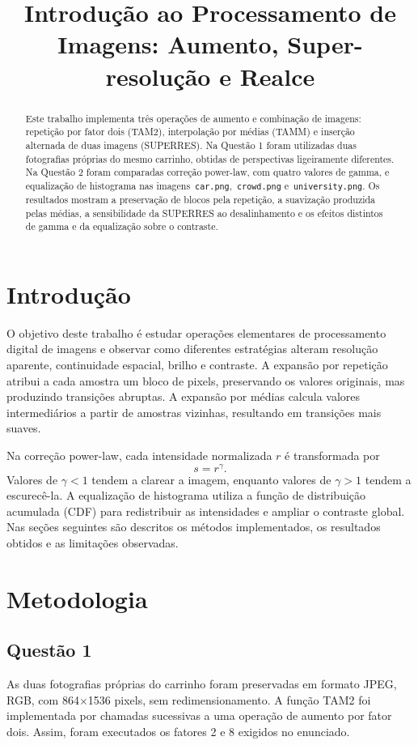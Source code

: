 \documentclass[conference]{IEEEtran}
\title{Introdução ao Processamento de Imagens: Aumento, Super-resolução e Realce}
\author{\IEEEauthorblockN{Luidgi Varela Carneiro}
\IEEEauthorblockA{Matrícula: 231011669\\
Universidade de Brasília}}
\begin{document}
\maketitle

\begin{abstract}
Este trabalho implementa três operações de aumento e combinação de imagens: repetição por fator dois (TAM2), interpolação por médias (TAMM) e inserção alternada de duas imagens (SUPERRES). Na Questão 1 foram utilizadas duas fotografias próprias do mesmo carrinho, obtidas de perspectivas ligeiramente diferentes. Na Questão 2 foram comparadas correção power-law, com quatro valores de gamma, e equalização de histograma nas imagens \,\texttt{car.png}, \,\texttt{crowd.png} e \,\texttt{university.png}. Os resultados mostram a preservação de blocos pela repetição, a suavização produzida pelas médias, a sensibilidade da SUPERRES ao desalinhamento e os efeitos distintos de gamma e da equalização sobre o contraste.
\end{abstract}

\section{Introdução}
O objetivo deste trabalho é estudar operações elementares de processamento digital de imagens e observar como diferentes estratégias alteram resolução aparente, continuidade espacial, brilho e contraste. A expansão por repetição atribui a cada amostra um bloco de pixels, preservando os valores originais, mas produzindo transições abruptas. A expansão por médias calcula valores intermediários a partir de amostras vizinhas, resultando em transições mais suaves.

Na correção power-law, cada intensidade normalizada $r$ é transformada por
\begin{equation}
    s = r^{\gamma}.
\end{equation}
Valores de $\gamma<1$ tendem a clarear a imagem, enquanto valores de $\gamma>1$ tendem a escurecê-la. A equalização de histograma utiliza a função de distribuição acumulada (CDF) para redistribuir as intensidades e ampliar o contraste global. Nas seções seguintes são descritos os métodos implementados, os resultados obtidos e as limitações observadas.

\section{Metodologia}
\subsection{Questão 1}
As duas fotografias próprias do carrinho foram preservadas em formato JPEG, RGB, com 864$\times$1536 pixels, sem redimensionamento. A função TAM2 foi implementada por chamadas sucessivas a uma operação de aumento por fator dois. Assim, foram executados os fatores 2 e 8 exigidos no enunciado.
\end{document}
